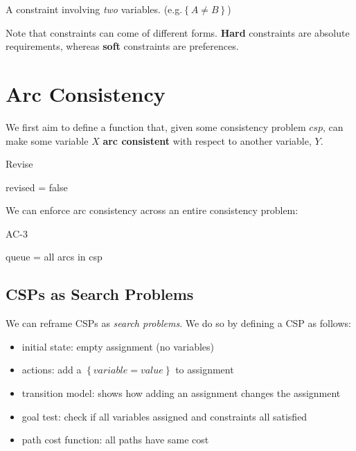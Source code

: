 \begin{definition}
	A constraint involving \emph{two} variables. (e.g.\(\left\{ A \neq  B \right\} \))
\end{definition}

Note that constraints can come of different forms. \textbf{Hard} constraints are absolute requirements, whereas \textbf{soft} constraints are preferences.

\section{Arc Consistency}
We first aim to define a function that, given some consistency problem \(csp\), can make some variable \(X\) \textbf{arc consistent} with respect to another variable, \(Y\).

\begin{algorithm}[H]
	\DontPrintSemicolon
	\caption{Revise}
	revised = false \\
\end{algorithm}

We can enforce arc consistency across an entire consistency problem:

\begin{algorithm}[H]
	\DontPrintSemicolon
	\caption{AC-3}
	queue = all arcs in csp \\
\end{algorithm}

\subsection{CSPs as Search Problems}
We can reframe CSPs as \emph{search problems}. We do so by defining a CSP as follows:
\begin{itemize}
	\item initial state: empty assignment (no variables)
	\item actions: add a \(\left\{ variable = value \right\} \) to assignment
	\item transition model: shows how adding an assignment changes the assignment
	\item goal test: check if all variables assigned and constraints all satisfied
	\item path cost function: all paths have same cost
\end{itemize}

